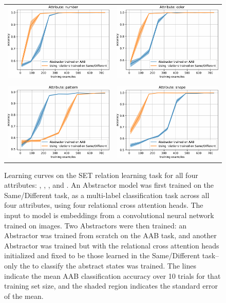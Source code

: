 \begin{figure}[t!]
	\begin{center}
	\begin{tabular}{cc}
		\includegraphics[width=.42\textwidth]{figures/set/AAB_comparison_number-crop} &
		\includegraphics[width=.42\textwidth]{figures/set/AAB_comparison_color-crop} \\
		&\\
		\includegraphics[width=.42\textwidth]{figures/set/AAB_comparison_pattern-crop} &
		\includegraphics[width=.42\textwidth]{figures/set/AAB_comparison_shape-crop}
	\end{tabular}
	\caption{Learning curves on the SET relation learning task for all four attributes: , , , and .  An Abstractor model was first trained on the Same/Different task, as a multi-label classification task across all four attributes, using four relational cross attention heads. The input to model is embeddings from a convolutional neural network trained on images. Two Abstractors were then trained: an Abstractor was trained from scratch on the AAB task, and another Abstractor was trained but with the relational cross attention heads initialized and fixed to be those learned in the Same/Different task--only the \MLP to classify the abstract states was trained. The lines indicate the mean AAB classification accuracy over 10 trials for that training set size, and the shaded region indicates the standard error of the mean.}
	\label{fig:aab_learning_curves}
    \end{center}
\end{figure}

